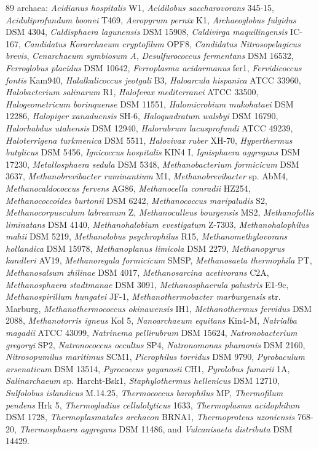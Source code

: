 89 archaea:
\textit{Acidianus hospitalis} W1,
\textit{Acidilobus saccharovorans} 345-15,
\textit{Aciduliprofundum boonei} T469,
\textit{Aeropyrum pernix} K1,
\textit{Archaeoglobus fulgidus} DSM 4304,
\textit{Caldisphaera lagunensis} DSM 15908,
\textit{Caldivirga maquilingensis} IC-167,
\textit{Candidatus Korarchaeum cryptofilum} OPF8,
\textit{Candidatus Nitrosopelagicus brevis},
\textit{Cenarchaeum symbiosum A},
\textit{Desulfurococcus fermentans} DSM 16532,
\textit{Ferroglobus placidus} DSM 10642,
\textit{Ferroplasma acidarmanus} fer1,
\textit{Fervidicoccus fontis} Kam940,
\textit{Halalkalicoccus jeotgali} B3,
\textit{Haloarcula hispanica} ATCC 33960,
\textit{Halobacterium salinarum} R1,
\textit{Haloferax mediterranei} ATCC 33500,
\textit{Halogeometricum borinquense} DSM 11551,
\textit{Halomicrobium mukohataei} DSM 12286,
\textit{Halopiger xanaduensis} SH-6,
\textit{Haloquadratum walsbyi} DSM 16790,
\textit{Halorhabdus utahensis} DSM 12940,
\textit{Halorubrum lacusprofundi} ATCC 49239,
\textit{Haloterrigena turkmenica} DSM 5511,
\textit{Halovivax ruber} XH-70,
\textit{Hyperthermus butylicus} DSM 5456,
\textit{Ignicoccus hospitalis} KIN4 I,
\textit{Ignisphaera aggregans} DSM 17230,
\textit{Metallosphaera sedula} DSM 5348,
\textit{Methanobacterium formicicum} DSM 3637,
\textit{Methanobrevibacter ruminantium} M1,
\textit{Methanobrevibacter} sp. AbM4,
\textit{Methanocaldococcus fervens} AG86,
\textit{Methanocella conradii} HZ254,
\textit{Methanococcoides burtonii} DSM 6242,
\textit{Methanococcus maripaludis} S2,
\textit{Methanocorpusculum labreanum} Z,
\textit{Methanoculleus bourgensis} MS2,
\textit{Methanofollis liminatans} DSM 4140,
\textit{Methanohalobium evestigatum} Z-7303,
\textit{Methanohalophilus mahii} DSM 5219,
\textit{Methanolobus psychrophilus} R15,
\textit{Methanomethylovorans hollandica} DSM 15978,
\textit{Methanoplanus limicola} DSM 2279,
\textit{Methanopyrus kandleri} AV19,
\textit{Methanoregula formicicum} SMSP,
\textit{Methanosaeta thermophila} PT,
\textit{Methanosalsum zhilinae} DSM 4017,
\textit{Methanosarcina acetivorans} C2A,
\textit{Methanosphaera stadtmanae} DSM 3091,
\textit{Methanosphaerula palustris} E1-9c,
\textit{Methanospirillum hungatei} JF-1,
\textit{Methanothermobacter marburgensis} str. Marburg,
\textit{Methanothermococcus okinawensis} IH1,
\textit{Methanothermus fervidus} DSM 2088,
\textit{Methanotorris igneus} Kol 5,
\textit{Nanoarchaeum equitans} Kin4-M,
\textit{Natrialba magadii} ATCC 43099,
\textit{Natrinema pellirubrum} DSM 15624,
\textit{Natronobacterium gregoryi} SP2,
\textit{Natronococcus occultus} SP4,
\textit{Natronomonas pharaonis} DSM 2160,
\textit{Nitrosopumilus maritimus} SCM1,
\textit{Picrophilus torridus} DSM 9790,
\textit{Pyrobaculum arsenaticum} DSM 13514,
\textit{Pyrococcus yayanosii} CH1,
\textit{Pyrolobus fumarii} 1A,
\textit{Salinarchaeum} sp. Harcht-Bsk1,
\textit{Staphylothermus hellenicus} DSM 12710,
\textit{Sulfolobus islandicus} M.14.25,
\textit{Thermococcus barophilus} MP,
\textit{Thermofilum pendens} Hrk 5,
\textit{Thermogladius cellulolyticus} 1633,
\textit{Thermoplasma acidophilum} DSM 1728,
\textit{Thermoplasmatales archaeon} BRNA1,
\textit{Thermoproteus uzoniensis} 768-20,
\textit{Thermosphaera aggregans} DSM 11486, and
\textit{Vulcanisaeta distributa} DSM 14429.


